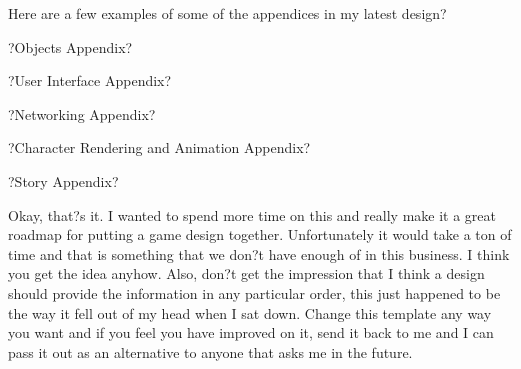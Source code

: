 \documentclass[a4paper]{article}
\begin{document}
	Here are a few examples of some of the appendices in my latest design?

 ?Objects Appendix?

?User Interface Appendix?

 ?Networking Appendix?

?Character Rendering and Animation Appendix?

 ?Story Appendix?

	Okay, that?s it.  I wanted to spend more time on this and really make it a great roadmap for putting a game design together.  Unfortunately it would take a ton of time and that is something that we don?t have enough of in this business.  I think you get the idea anyhow.  Also, don?t get the impression that I think a design should provide the information in any particular order, this just happened to be the way it fell out of my head when I sat down.  Change this template any way you want and if you feel you have improved on it, send it back to me and I can pass it out as an alternative to anyone that asks me in the future.
\end{document}
